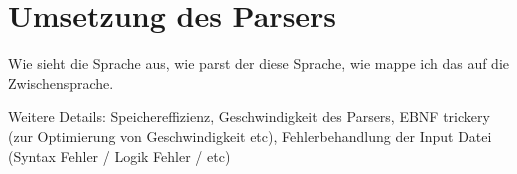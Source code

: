 \chapter{Umsetzung des Parsers}
\label{chapter}

Wie sieht die Sprache aus, wie parst der diese Sprache, wie mappe ich das auf die Zwischensprache.

Weitere Details: Speichereffizienz, Geschwindigkeit des Parsers, EBNF trickery (zur Optimierung von Geschwindigkeit etc), Fehlerbehandlung der Input Datei (Syntax Fehler / Logik Fehler / etc)
